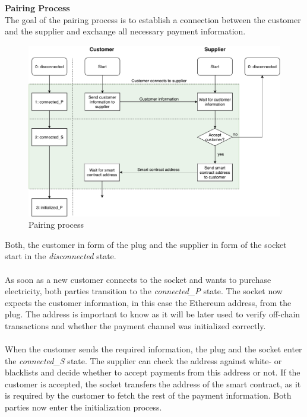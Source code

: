 \textbf{Pairing Process}\\
The goal of the pairing process is to establish a connection between the customer and the supplier and exchange all necessary payment information.
\\
\begin{figure}[H]
    \includegraphics[width=\textwidth]{img/Plug-Socket-pairing_process.pdf}
    \caption{Pairing process}
    \label{fig:pairing_process}
\end{figure}
Both, the customer in form of the plug and the supplier in form of the socket start in the \textit{disconnected} state.
\\\\
As soon as a new customer connects to the socket and wants to purchase electricity, both parties transition to the \textit{connected\_P} state.
The socket now expects the customer information, in this case the Ethereum address, from the plug.
The address is important to know as it will be later used to verify off-chain transactions and whether the payment channel was initialized correctly.
\\\\
When the customer sends the required information, the plug and the socket enter the \textit{connected\_S} state.
The supplier can check the address against white- or blacklists and decide whether to accept payments from this address or not.
If the customer is accepted, the socket transfers the address of the smart contract, as it is required by the customer to fetch the rest of the payment information.
Both parties now enter the initialization process.
\\\\\\
